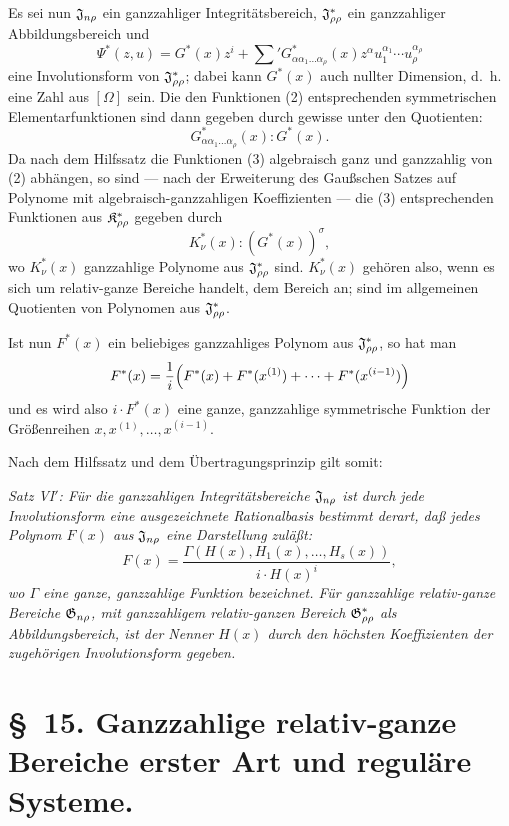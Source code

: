 Es sei nun $\mathfrak{J}_{n\rho}$ ein ganzzahliger Integritätsbereich, $\mathfrak{J}^*_{\rho\rho}$ ein ganzzahliger Abbildungsbereich und
\[
  \Psi^*(z,u)=G^*(x)z^i+
  \sum{}'G^*_{\alpha\alpha_1\ldots\alpha_\rho}(x)
  z^\alpha u_1^{\alpha_1}\cdots u_\rho^{\alpha_\rho}
\]
eine Involutionsform von $\mathfrak{J}^*_{\rho\rho}$; dabei kann $G^*(x)$ auch nullter Dimension, d.~h. eine Zahl aus $[\Omega]$ sein. Die den Funktionen (2) entsprechenden symmetrischen Elementarfunktionen sind dann gegeben durch gewisse unter den Quotienten:
\begin{equation}
  G^*_{\alpha\alpha_1\ldots\alpha_\rho}(x):G^*(x).
\tag{4}
\end{equation}
Da nach dem Hilfssatz die Funktionen (3) algebraisch ganz und ganzzahlig von (2) abhängen, so sind --- nach der Erweiterung des Gaußschen Satzes auf Polynome mit algebraisch-ganzzahligen Koeffizienten --- die (3) entsprechenden Funktionen aus $\mathfrak{K}^*_{\rho\rho}$ gegeben durch
\begin{equation}
  K_\nu^*(x):(G^*(x))^\sigma,
\tag{5}
\end{equation}
wo $K_\nu^*(x)$ ganzzahlige Polynome aus $\mathfrak{J}^*_{\rho\rho}$ sind. $K_\nu^*(x)$ gehören also, wenn es sich um relativ-ganze Bereiche handelt, dem Bereich an; sind im allgemeinen Quotienten von Polynomen aus $\mathfrak{J}^*_{\rho\rho}$.

Ist nun $F^*(x)$ ein beliebiges ganzzahliges Polynom aus $\mathfrak{J}^*_{\rho\rho}$, so hat man
\[
  F^*(x)=\frac1i\Bigl(F^*(x)+F^*(x^{(1)})+\cdots+F^*(x^{(i-1)})\Bigr)
\]
und es wird also $i\cdot F^*(x)$ eine ganze, ganzzahlige symmetrische Funktion der Größenreihen $x,x^{(1)},\ldots,x^{(i-1)}$.

Nach dem Hilfssatz und dem Übertragungsprinzip gilt somit:

\emph{Satz VI$'$: Für die ganzzahligen Integritätsbereiche $\mathfrak{J}_{n\rho}$ ist durch jede Involutionsform eine ausgezeichnete Rationalbasis bestimmt derart, daß jedes Polynom $F(x)$ aus $\mathfrak{J}_{n\rho}$ eine Darstellung zuläßt:}
\[
  F(x)=\frac{\Gamma(H(x),H_1(x),\ldots,H_s(x))}{i\cdot H(x)^i},
\]
\emph{wo $\Gamma$ eine ganze, ganzzahlige Funktion bezeichnet. Für ganzzahlige relativ-ganze Bereiche $\mathfrak{G}_{n\rho}$, mit ganzzahligem relativ-ganzen Bereich $\mathfrak{G}^*_{\rho\rho}$ als Abbildungsbereich, ist der Nenner $H(x)$ durch den höchsten Koeffizienten der zugehörigen Involutionsform gegeben.}

\section*{\S\ 15. Ganzzahlige relativ-ganze Bereiche erster Art und reguläre Systeme.}

